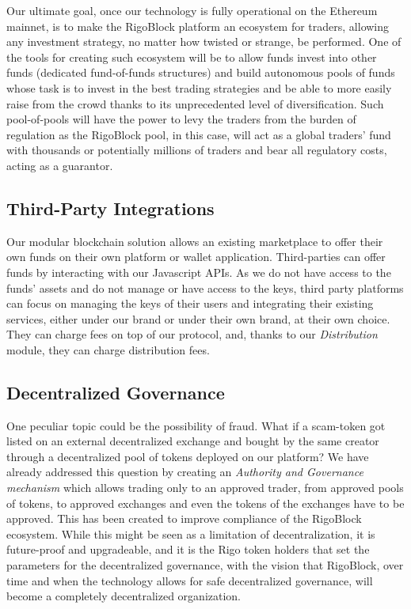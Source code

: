 \documentclass[9pt,oneside]{amsart}
\begin{document}
\begin{multicols}{2}
Our ultimate goal, once our technology is fully operational on the Ethereum mainnet, is to make the RigoBlock platform an ecosystem for traders, allowing any investment strategy, no matter how twisted or strange, be performed. One of the tools for creating such ecosystem will be to allow funds invest into other funds (dedicated fund-of-funds structures) and build autonomous pools of funds whose task is to invest in the best trading strategies and be able to more easily raise from the crowd thanks to its unprecedented level of diversification. Such pool-of-pools will have the power to levy the traders from the burden of regulation as the RigoBlock pool, in this case, will act as a global traders’ fund with thousands or potentially millions of traders and bear all regulatory costs, acting as a guarantor.

\subsection{Third-Party Integrations}
Our modular blockchain solution allows an existing marketplace to offer their own funds on their own platform or wallet application. Third-parties can offer funds by interacting with our Javascript APIs. As we do not have access to the funds' assets and do not manage or have access to the keys, third party platforms can focus on managing the keys of their users and integrating their existing services, either under our brand or under their own brand, at their own choice. They can charge fees on top of our protocol, and, thanks to our \textit{Distribution} module, they can charge distribution fees.

\subsection{Decentralized Governance}
One peculiar topic could be the possibility of fraud. What if a scam-token got listed on an external decentralized exchange and bought by the same creator through a decentralized pool of tokens deployed on our platform? We have already addressed this question by creating an \textit{Authority and Governance mechanism} which allows trading only to an approved trader, from approved pools of tokens, to approved exchanges and even the tokens of the exchanges have to be approved. This has been created to improve compliance of the RigoBlock ecosystem. While this might be seen as a limitation of decentralization, it is future-proof and upgradeable, and it is the Rigo token holders that set the parameters for the decentralized governance, with the vision that RigoBlock, over time and when the technology allows for safe decentralized governance, will become a completely decentralized organization.


\end{multicols}
\end{document}
